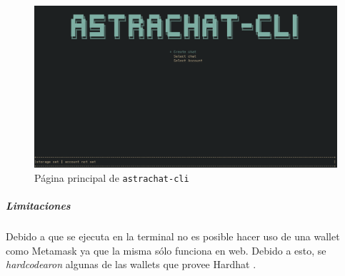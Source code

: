\begin{figure}[H]
    \centering
    \includegraphics[width=1\linewidth]{img/astrachat-cli-main-page.png}
    \caption{Página principal de \texttt{astrachat-cli}}
    \label{fig:astrachat-cli-main-page}
\end{figure}

\subparagraph{Limitaciones}

Debido a que se ejecuta en la terminal no es posible hacer uso de una wallet como Metamask \cite{metamask} ya que la misma sólo funciona en web. Debido a esto, se \textit{hardcodearon} algunas de las wallets que provee Hardhat \cite{hardhat}.